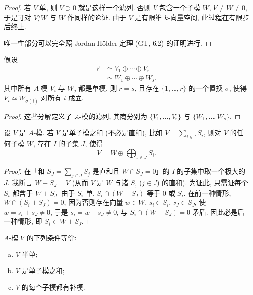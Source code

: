 \begin{proof}
若 $V$ 单, 则 $V\supset 0$ 就是这样一个滤列. 否则 $V$ 包含一个子模 $W$, $V\neq W\neq 0$, 于是可对 $V/W$ 与 $W$ 作同样的论证. 由于 $V$ 是有限维 $k$-向量空间, 此过程在有限步后终止.

唯一性部分可以完全照 Jordan-H\"older 定理 (GT, 6.2) 的证明进行.
\end{proof}

\begin{corollary}\label{cor:iv.1.3}
假设
\[
\begin{aligned}
V&\simeq V_1\oplus\cdots\oplus V_r\\
&\simeq W_1\oplus\cdots\oplus W_s,
\end{aligned}
\]
其中所有 $A$-模 $V_i$ 与 $W_j$ 都是单模. 则 $r=s$, 且存在 $\{1,\ldots,r\}$ 的一个置换 $\sigma$, 使得 $V_i\simeq W_{\sigma(i)}$ 对所有 $i$ 成立.
\end{corollary}

\begin{proof}
这些分解定义了 $A$-模的滤列, 其商分别为 $\{V_1,\ldots,V_r\}$ 与 $\{W_1,\ldots,W_s\}$.
\end{proof}

\begin{proposition}\label{prop:iv.1.4}
设 $V$ 是 $A$-模. 若 $V$ 是单子模之和 (不必是直和), 比如 $V=\sum_{i\in I}S_i$, 则对 $V$ 的任何子模 $W$, 存在 $I$ 的子集 $J$, 使得
\[
V=W\oplus\bigoplus_{i\in J}S_i.
\]
\end{proposition}

\begin{proof}
在「和 $S_J=\sum_{j\in J}S_j$ 是直和且 $W\cap S_J=0$」的 $I$ 的子集中取一个极大的 $J$. 我断言 $W+S_J=V$ (从而 $V$ 是 $W$ 与诸 $S_j$ ($j\in J$) 的直和). 为证此, 只需证每个 $S_i$ 都含于 $W+S_J$. 由于 $S_i$ 单, $S_i\cap(W+S_J)$ 等于 $0$ 或 $S_i$. 在前一种情形, $W\cap(S_i+S_J)=0$, 因为否则存在向量 $w\in W$, $s_i\in S_i$, $s_J\in S_J$, 使 $w=s_i+s_J\neq 0$, 于是 $s_i=w-s_J\neq 0$, 与 $S_i\cap(W+S_J)=0$ 矛盾. 因此必是后一种情形, 即 $S_i\subset W+S_J$.
\end{proof}

\begin{corollary}\label{cor:iv.1.5}
$A$-模 $V$ 的下列条件等价:

\begin{enumerate}[(a)]
\item $V$ 半单;
\item $V$ 是单子模之和;
\item $V$ 的每个子模都有补模.
\end{enumerate}
\end{corollary}


